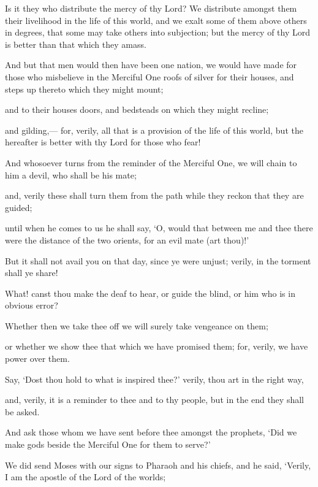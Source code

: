\documentclass[fontsize=14pt, letterpaper, notitlepage, openany, DIV=12]{scrbook} %
\begin{document}
\noindent[43:32]
Is it they who distribute the mercy of thy Lord? We distribute amongst them their
livelihood in the life of this world, and we exalt some of them above others in degrees, that some
may take others into subjection; but the mercy of thy Lord is better than that which they amass.

\noindent[43:33]
And but that men would then have been one nation, we would have made for those who
misbelieve in the Merciful One roofs of silver for their houses, and steps up thereto which they
might mount;

\noindent[43:34]
and to their houses doors, and bedsteads on which they might recline;

\noindent[43:35]
and gilding,--- for, verily, all that is a provision of the life of this world, but the hereafter
is better with thy Lord for those who fear!

\noindent[43:36]
And whosoever turns from the reminder of the Merciful One, we will chain to him a
devil, who shall be his mate;

\noindent[43:37]
and, verily these shall turn them from the path while they reckon that they are guided;

\noindent[43:38]
until when he comes to us he shall say, `O, would that between me and thee there were
the distance of the two orients, for an evil mate (art thou)!'

\noindent[43:39]
But it shall not avail you on that day, since ye were unjust; verily, in the torment shall ye
share!

\noindent[43:40]
What! canst thou make the deaf to hear, or guide the blind, or him who is in obvious
error?

\noindent[43:41]
Whether then we take thee off we will surely take vengeance on them;

\noindent[43:42]
or whether we show thee that which we have promised them; for, verily, we have power
over them.

\noindent[43:43]
Say, `Dost thou hold to what is inspired thee?' verily, thou art in the right way,

\noindent[43:44]
and, verily, it is a reminder to thee and to thy people, but in the end they shall be asked.

\noindent[43:45]
And ask those whom we have sent before thee amongst the prophets, `Did we make gods
beside the Merciful One for them to serve?'

\noindent[43:46]
We did send Moses with our signs to Pharaoh and his chiefs, and he said, `Verily, I am
the apostle of the Lord of the worlds;
\end{document}
